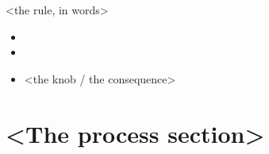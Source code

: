 \documentclass[aspectratio=169]{beamer}
\begin{document}
\begin{frame}{<the rule, in words>}
  \centering

  \vspace{4mm}
  \begin{itemize}[<+->]
    \item <what the first term does, a few words>
    \item <what the second term does, a few words>
    \item <the knob / the consequence>
  \end{itemize}

\end{frame}

\section{<The process section>}
\end{document}
